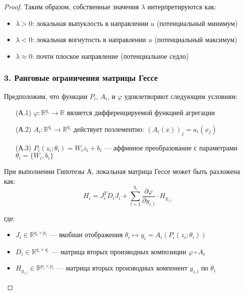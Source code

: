 \documentclass[a4paper,12pt]{article}
\begin{document}
\begin{proof}
    Таким образом, собственные значения $λ$ интерпретируются как:
    \begin{itemize}
    \item $λ > 0$: локальная выпуклость в направлении $u$ (потенциальный минимум)
    \item $λ < 0$: локальная вогнутость в направлении $u$ (потенциальный максимум)
    \item $λ \approx 0$: почти плоское направление (потенциальное седло)
    \end{itemize}
    
    \subsubsection*{3. Ранговые ограничения матрицы Гессе}
    
    \begin{hypothesis}
    Предположим, что функции $P_i$, $A_i$, и $\varphi$ удовлетворяют следующим условиям:
    \begin{enumerate}
    \item[(А.1)] $\varphi: \mathbb{R}^{q_i} \rightarrow \mathbb{R}$ является дифференцируемой функцией агрегации
    \item[(А.2)] $A_i: \mathbb{R}^{q_i} \rightarrow \mathbb{R}^{q_i}$ действует поэлементно: $(A_i(x))_j = a_i(x_j)$
    \item[(А.3)] $P_i(z_i; \theta_i) = W_i z_i + b_i$ — аффинное преобразование с параметрами $\theta_i = \{W_i, b_i\}$
    \end{enumerate}
    \end{hypothesis}
    
    При выполнении Гипотезы А, локальная матрица Гессе может быть разложена как:
    \begin{equation}
    H_i = J_i^T D_i J_i + \sum_{l=1}^{q_i} \frac{\partial \varphi}{\partial y_{i,l}} \cdot H_{y_{i,l}}
    \end{equation}
    
    где:
    \begin{itemize}
    \item $J_i \in \mathbb{R}^{q_i \times p_i}$ — якобиан отображения $\theta_i \mapsto y_i = A_i(P_i(z_i; \theta_i))$
    \item $D_i \in \mathbb{R}^{q_i \times q_i}$ — матрица вторых производных композиции $\varphi \circ A_i$
    \item $H_{y_{i,l}} \in \mathbb{R}^{p_i \times p_i}$ — матрица вторых производных компонент $y_{i,l}$ по $\theta_i$
    \end{itemize}
    

\end{proof}
\end{document}
